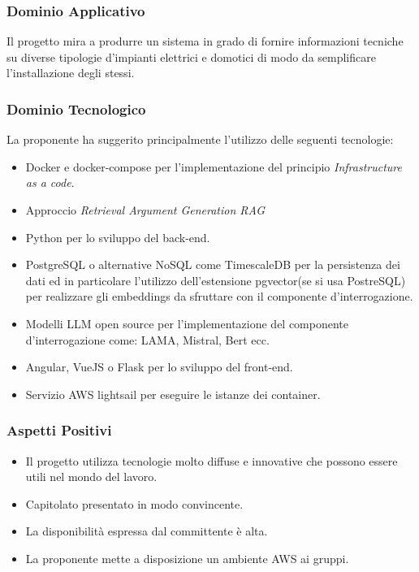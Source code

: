 \documentclass[a4paper, 12pt]{article}
\begin{document}
\subsubsection{Dominio Applicativo}
Il progetto mira a produrre un sistema in grado di fornire informazioni tecniche su diverse tipologie d'impianti elettrici e domotici di modo da semplificare l’installazione degli stessi.

\subsubsection{Dominio Tecnologico}
La proponente ha suggerito principalmente l’utilizzo delle seguenti tecnologie:
\begin{itemize}
    \item Docker e docker-compose per l’implementazione del principio \textit{Infrastructure as a code}.
    \item Approccio\textit{ Retrieval Argument Generation RAG}
    \item Python per lo sviluppo del back-end.
    \item PostgreSQL o alternative NoSQL come TimescaleDB per la persistenza dei dati ed in particolare l’utilizzo dell’estensione pgvector(se si usa PostreSQL) per realizzare gli embeddings da sfruttare con il componente d'interrogazione.
    \item Modelli LLM open source per l’implementazione del componente d'interrogazione come: LAMA, Mistral, Bert ecc.
    \item Angular, VueJS o Flask per lo sviluppo del front-end.
    \item Servizio AWS lightsail per eseguire le istanze dei container.
\end{itemize}

\subsubsection{Aspetti Positivi}
\begin{itemize}
    \item Il progetto utilizza tecnologie molto diffuse e innovative che possono essere utili nel mondo del lavoro.
    \item Capitolato presentato in modo convincente.
    \item La disponibilità espressa dal committente è alta.
    \item La proponente mette a disposizione un ambiente AWS ai gruppi.
\end{itemize}
\end{document}
